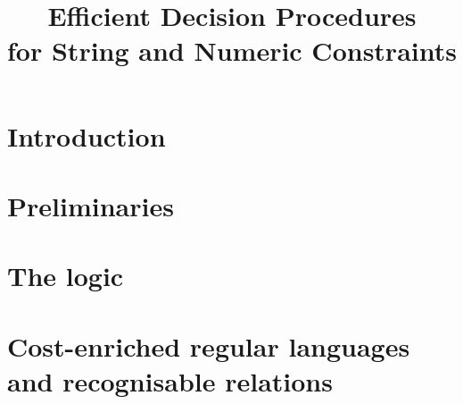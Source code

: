 \documentclass{llncs}
\title{Efficient Decision Procedures \\ for
 String and Numeric Constraints}
\author{}
\institute{ }
\begin{document}
\maketitle

\begin{abstract}
\end{abstract}

%
%

\section{Introduction}

\section{Preliminaries}



\section{The logic \slint}





\section{Cost-enriched regular languages and recognisable relations}
\end{document}
